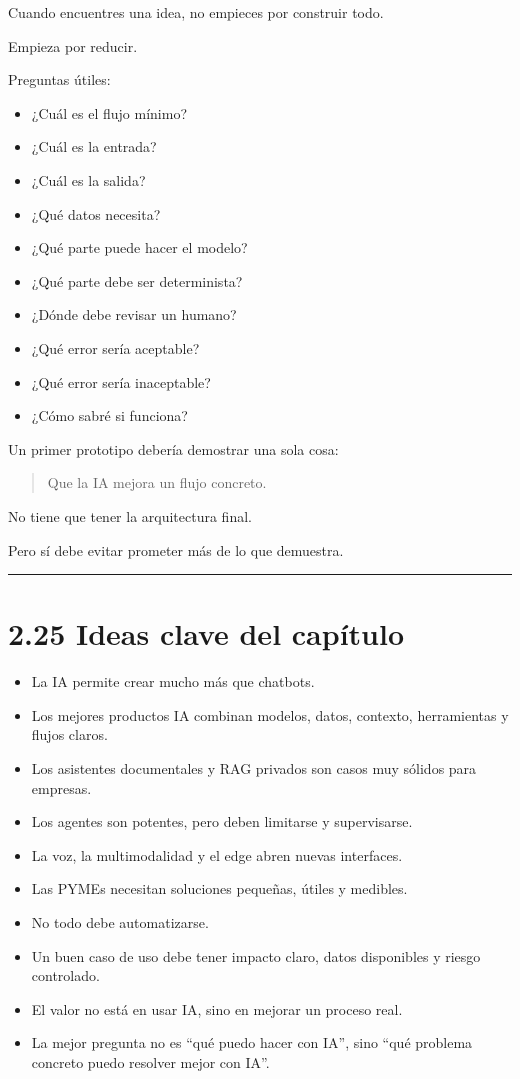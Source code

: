 Cuando encuentres una idea, no empieces por construir todo.

Empieza por reducir.

Preguntas útiles:

\begin{itemize}
\tightlist
\item
  ¿Cuál es el flujo mínimo?
\item
  ¿Cuál es la entrada?
\item
  ¿Cuál es la salida?
\item
  ¿Qué datos necesita?
\item
  ¿Qué parte puede hacer el modelo?
\item
  ¿Qué parte debe ser determinista?
\item
  ¿Dónde debe revisar un humano?
\item
  ¿Qué error sería aceptable?
\item
  ¿Qué error sería inaceptable?
\item
  ¿Cómo sabré si funciona?
\end{itemize}

Un primer prototipo debería demostrar una sola cosa:

\begin{quote}
Que la IA mejora un flujo concreto.
\end{quote}

No tiene que tener la arquitectura final.

Pero sí debe evitar prometer más de lo que demuestra.

\begin{center}\rule{0.5\linewidth}{0.5pt}\end{center}

\section{2.25 Ideas clave del
capítulo}\label{ideas-clave-del-capuxedtulo-1}

\begin{itemize}
\tightlist
\item
  La IA permite crear mucho más que chatbots.
\item
  Los mejores productos IA combinan modelos, datos, contexto,
  herramientas y flujos claros.
\item
  Los asistentes documentales y RAG privados son casos muy sólidos para
  empresas.
\item
  Los agentes son potentes, pero deben limitarse y supervisarse.
\item
  La voz, la multimodalidad y el edge abren nuevas interfaces.
\item
  Las PYMEs necesitan soluciones pequeñas, útiles y medibles.
\item
  No todo debe automatizarse.
\item
  Un buen caso de uso debe tener impacto claro, datos disponibles y
  riesgo controlado.
\item
  El valor no está en usar IA, sino en mejorar un proceso real.
\item
  La mejor pregunta no es ``qué puedo hacer con IA'', sino ``qué
  problema concreto puedo resolver mejor con IA''.
\end{itemize}

